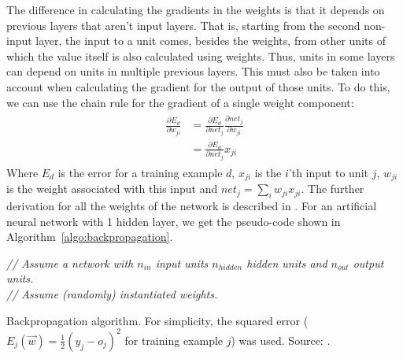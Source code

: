 The difference in calculating the gradients in the weights is that it depends on previous layers that aren't input layers. That is, starting from the second non-input layer, the input to a unit comes, besides the weights, from other units of which the value itself is also calculated using weights.
Thus, units in some layers can depend on units in multiple previous layers.
This must also be taken into account when calculating the gradient for the output of those units.
To do this, we can use the chain rule for the gradient of a single weight component:
\begin{align}
    \begin{split}
        \frac{\partial E_d}{\partial w_{ji}} &= \frac{\partial E_d}{\partial net_j} \frac{\partial net_j}{\partial w_{ji}}\\
        &= \frac{\partial E_d}{\partial net_j} x_{ji}
    \end{split}
\end{align}
Where $E_d$ is the error for a training example $d$, $x_{ji}$ is the $i$'th input to unit $j$, $w_{ji}$ is the weight associated with this input and $net_j = \sum_i w_{ji} x_{ji}$. The further derivation for all the weights of the network is described in \cite[Chapter~4]{ML}. For an artificial neural network with 1 hidden layer, we get the pseudo-code shown in Algorithm~\ref{algo:backpropagation}.\\
\begin{algorithm}[htb]
\DontPrintSemicolon
{}
\emph{// Assume a network with $n_{in}$ input units $n_{hidden}$ hidden units and $n_{out}$ output units.}\\
\emph{// Assume (randomly) instantiated weights.}\\
\caption[Backpropagation]{Backpropagation algorithm. For simplicity, the squared error ($E_j(\overrightarrow{w}) = \frac{1}{2} (y_j - o_j)^2$ for training example $j$) was used. Source: \cite[Chapter~4]{ML}.}
\label{algo:backpropagation}
\end{algorithm}

